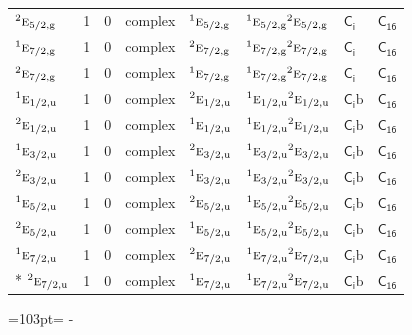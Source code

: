 \documentclass[10pt,a4paper]{article}
\newcommand{\needspace}[1]{\par\penalty-100\begingroup\dimen0=#1\relax\dimen2=\pagegoal
  \advance\dimen2-\pagetotal\ifdim\dimen0>\dimen2\relax\ifdim\dimen2>0pt\vfil\break\fi\fi
  \endgroup}
\numberwithin{equation}{section}
\newcommand{\grp}[1]{\mathsf{#1}}
\newcommand{\irr}[1]{\text{\normalfont\scshape #1}}
\newcommand{\conjpair}[1]{{}^{#1}}
\newcommand{\ptag}[1]{\mathrm{#1}}
\newcommand{\secondclass}{\mathrm{b}}
\begin{document}
{\begin{longtable}{@{}lrrlllll@{}}
$\conjpair{2}\irr{e}_{5/2,\ptag{g}}$ & 1 & $0$ & complex & $\conjpair{1}\irr{e}_{5/2,\ptag{g}}$ & $\conjpair{1}\irr{e}_{5/2,\ptag{g}}\conjpair{2}\irr{e}_{5/2,\ptag{g}}$ & \href{S2.pdf}{$\grp{C_{i}}$} & $\grp{C_{16}}$\\
$\conjpair{1}\irr{e}_{7/2,\ptag{g}}$ & 1 & $0$ & complex & $\conjpair{2}\irr{e}_{7/2,\ptag{g}}$ & $\conjpair{1}\irr{e}_{7/2,\ptag{g}}\conjpair{2}\irr{e}_{7/2,\ptag{g}}$ & \href{S2.pdf}{$\grp{C_{i}}$} & $\grp{C_{16}}$\\
$\conjpair{2}\irr{e}_{7/2,\ptag{g}}$ & 1 & $0$ & complex & $\conjpair{1}\irr{e}_{7/2,\ptag{g}}$ & $\conjpair{1}\irr{e}_{7/2,\ptag{g}}\conjpair{2}\irr{e}_{7/2,\ptag{g}}$ & \href{S2.pdf}{$\grp{C_{i}}$} & $\grp{C_{16}}$\\
$\conjpair{1}\irr{e}_{1/2,\ptag{u}}$ & 1 & $0$ & complex & $\conjpair{2}\irr{e}_{1/2,\ptag{u}}$ & $\conjpair{1}\irr{e}_{1/2,\ptag{u}}\conjpair{2}\irr{e}_{1/2,\ptag{u}}$ & \href{S2b.pdf}{$\grp{C_{i}}\secondclass$} & $\grp{C_{16}}$\\
$\conjpair{2}\irr{e}_{1/2,\ptag{u}}$ & 1 & $0$ & complex & $\conjpair{1}\irr{e}_{1/2,\ptag{u}}$ & $\conjpair{1}\irr{e}_{1/2,\ptag{u}}\conjpair{2}\irr{e}_{1/2,\ptag{u}}$ & \href{S2b.pdf}{$\grp{C_{i}}\secondclass$} & $\grp{C_{16}}$\\
$\conjpair{1}\irr{e}_{3/2,\ptag{u}}$ & 1 & $0$ & complex & $\conjpair{2}\irr{e}_{3/2,\ptag{u}}$ & $\conjpair{1}\irr{e}_{3/2,\ptag{u}}\conjpair{2}\irr{e}_{3/2,\ptag{u}}$ & \href{S2b.pdf}{$\grp{C_{i}}\secondclass$} & $\grp{C_{16}}$\\
$\conjpair{2}\irr{e}_{3/2,\ptag{u}}$ & 1 & $0$ & complex & $\conjpair{1}\irr{e}_{3/2,\ptag{u}}$ & $\conjpair{1}\irr{e}_{3/2,\ptag{u}}\conjpair{2}\irr{e}_{3/2,\ptag{u}}$ & \href{S2b.pdf}{$\grp{C_{i}}\secondclass$} & $\grp{C_{16}}$\\
$\conjpair{1}\irr{e}_{5/2,\ptag{u}}$ & 1 & $0$ & complex & $\conjpair{2}\irr{e}_{5/2,\ptag{u}}$ & $\conjpair{1}\irr{e}_{5/2,\ptag{u}}\conjpair{2}\irr{e}_{5/2,\ptag{u}}$ & \href{S2b.pdf}{$\grp{C_{i}}\secondclass$} & $\grp{C_{16}}$\\
$\conjpair{2}\irr{e}_{5/2,\ptag{u}}$ & 1 & $0$ & complex & $\conjpair{1}\irr{e}_{5/2,\ptag{u}}$ & $\conjpair{1}\irr{e}_{5/2,\ptag{u}}\conjpair{2}\irr{e}_{5/2,\ptag{u}}$ & \href{S2b.pdf}{$\grp{C_{i}}\secondclass$} & $\grp{C_{16}}$\\
$\conjpair{1}\irr{e}_{7/2,\ptag{u}}$ & 1 & $0$ & complex & $\conjpair{2}\irr{e}_{7/2,\ptag{u}}$ & $\conjpair{1}\irr{e}_{7/2,\ptag{u}}\conjpair{2}\irr{e}_{7/2,\ptag{u}}$ & \href{S2b.pdf}{$\grp{C_{i}}\secondclass$} & $\grp{C_{16}}$\\*
$\conjpair{2}\irr{e}_{7/2,\ptag{u}}$ & 1 & $0$ & complex & $\conjpair{1}\irr{e}_{7/2,\ptag{u}}$ & $\conjpair{1}\irr{e}_{7/2,\ptag{u}}\conjpair{2}\irr{e}_{7/2,\ptag{u}}$ & \href{S2b.pdf}{$\grp{C_{i}}\secondclass$} & $\grp{C_{16}}$\\
\bottomrule\end{longtable}}
\needspace{103pt}
\end{document}

